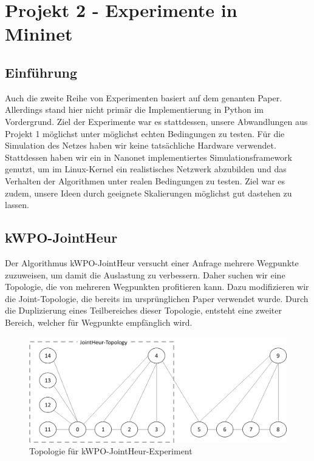 \documentclass[sigconf,noacm,review]{acmart}
\begin{document}
\section{Projekt 2 - Experimente in Mininet}
\subsection{Einführung}
Auch die zweite Reihe von Experimenten basiert auf dem genanten Paper. Allerdings stand hier nicht primär die Implementierung in Python im Vordergrund. Ziel der Experimente war es stattdessen,
unsere Abwandlungen aus Projekt 1 möglichst unter möglichst echten Bedingungen zu testen. Für die Simulation des Netzes haben wir keine tatsächliche Hardware verwendet.
Stattdessen haben wir ein in Nanonet implementiertes Simulationsframework genutzt, um im Linux-Kernel ein realistisches Netzwerk abzubilden und das Verhalten der Algorithmen unter realen Bedingungen zu testen. Ziel war es zudem, unsere Ideen durch geeignete Skalierungen möglichst gut dastehen zu lassen.

\subsection{kWPO-JointHeur}
Der Algorithmus kWPO-JointHeur versucht einer Anfrage mehrere Wegpunkte zuzuweisen, um damit die Auslastung zu verbessern. Daher suchen wir eine Topologie, die von mehreren Wegpunkten profitieren kann. Dazu modifizieren wir die Joint-Topologie, die bereits im ursprünglichen Paper verwendet wurde. Durch die Duplizierung eines Teilbereiches dieser Topologie, entsteht eine zweiter Bereich, welcher für Wegpunkte empfänglich wird.
\begin{figure}[h]
  \centering
  \includegraphics[width=\linewidth]{abbildungen/kWPO_topo.png}
  \caption{Topologie für kWPO-JointHeur-Experiment}
\end{figure}
\end{document}
